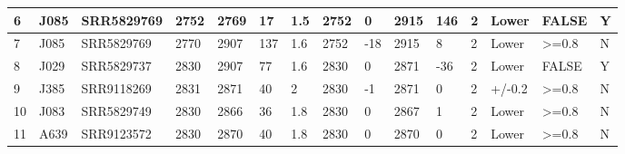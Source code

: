\documentclass[a4paper]{paper}
\begin{document}
\begin{table}[htp]
\begin{tabular}{p{3cm}llllllllllllll}
\multicolumn{1}{|l|}{6} & \multicolumn{1}{l|}{J085} & \multicolumn{1}{l|}{SRR5829769} & \multicolumn{1}{l|}{2752} & \multicolumn{1}{l|}{2769} & \multicolumn{1}{l|}{17} & \multicolumn{1}{l|}{1.5} & \multicolumn{1}{l|}{2752} & \multicolumn{1}{l|}{0} & \multicolumn{1}{l|}{2915} & \multicolumn{1}{l|}{146} & \multicolumn{1}{l|}{2} & \multicolumn{1}{l|}{Lower} & \multicolumn{1}{l|}{FALSE} & \multicolumn{1}{l|}{Y} \\ \hline
\multicolumn{1}{|l|}{7} & \multicolumn{1}{l|}{J085} & \multicolumn{1}{l|}{SRR5829769} & \multicolumn{1}{l|}{2770} & \multicolumn{1}{l|}{2907} & \multicolumn{1}{l|}{137} & \multicolumn{1}{l|}{1.6} & \multicolumn{1}{l|}{2752} & \multicolumn{1}{l|}{-18} & \multicolumn{1}{l|}{2915} & \multicolumn{1}{l|}{8} & \multicolumn{1}{l|}{2} & \multicolumn{1}{l|}{Lower} & \multicolumn{1}{l|}{\textgreater{}=0.8} & \multicolumn{1}{l|}{N} \\ \hline
\multicolumn{1}{|l|}{8} & \multicolumn{1}{l|}{J029} & \multicolumn{1}{l|}{SRR5829737} & \multicolumn{1}{l|}{2830} & \multicolumn{1}{l|}{2907} & \multicolumn{1}{l|}{77} & \multicolumn{1}{l|}{1.6} & \multicolumn{1}{l|}{2830} & \multicolumn{1}{l|}{0} & \multicolumn{1}{l|}{2871} & \multicolumn{1}{l|}{-36} & \multicolumn{1}{l|}{2} & \multicolumn{1}{l|}{Lower} & \multicolumn{1}{l|}{FALSE} & \multicolumn{1}{l|}{Y} \\ \hline
\multicolumn{1}{|l|}{9} & \multicolumn{1}{l|}{J385} & \multicolumn{1}{l|}{SRR9118269} & \multicolumn{1}{l|}{2831} & \multicolumn{1}{l|}{2871} & \multicolumn{1}{l|}{40} & \multicolumn{1}{l|}{2} & \multicolumn{1}{l|}{2830} & \multicolumn{1}{l|}{-1} & \multicolumn{1}{l|}{2871} & \multicolumn{1}{l|}{0} & \multicolumn{1}{l|}{2} & \multicolumn{1}{l|}{+/-0.2} & \multicolumn{1}{l|}{\textgreater{}=0.8} & \multicolumn{1}{l|}{N} \\ \hline
\multicolumn{1}{|l|}{10} & \multicolumn{1}{l|}{J083} & \multicolumn{1}{l|}{SRR5829749} & \multicolumn{1}{l|}{2830} & \multicolumn{1}{l|}{2866} & \multicolumn{1}{l|}{36} & \multicolumn{1}{l|}{1.8} & \multicolumn{1}{l|}{2830} & \multicolumn{1}{l|}{0} & \multicolumn{1}{l|}{2867} & \multicolumn{1}{l|}{1} & \multicolumn{1}{l|}{2} & \multicolumn{1}{l|}{Lower} & \multicolumn{1}{l|}{\textgreater{}=0.8} & \multicolumn{1}{l|}{N} \\ \hline
\multicolumn{1}{|l|}{11} & \multicolumn{1}{l|}{A639} & \multicolumn{1}{l|}{SRR9123572} & \multicolumn{1}{l|}{2830} & \multicolumn{1}{l|}{2870} & \multicolumn{1}{l|}{40} & \multicolumn{1}{l|}{1.8} & \multicolumn{1}{l|}{2830} & \multicolumn{1}{l|}{0} & \multicolumn{1}{l|}{2870} & \multicolumn{1}{l|}{0} & \multicolumn{1}{l|}{2} & \multicolumn{1}{l|}{Lower} & \multicolumn{1}{l|}{\textgreater{}=0.8} & \multicolumn{1}{l|}{N} \\ \hline

\end{tabular}
\end{table}
\end{document}

